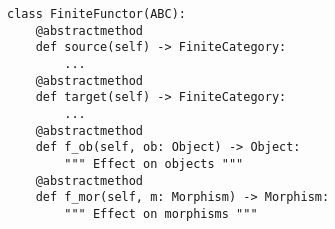 \par\begin{minipage}{60ex}
\begin{verbatim}
class FiniteFunctor(ABC):
    @abstractmethod
    def source(self) -> FiniteCategory:
        ...
    @abstractmethod
    def target(self) -> FiniteCategory:
        ...
    @abstractmethod
    def f_ob(self, ob: Object) -> Object:
        """ Effect on objects """
    @abstractmethod
    def f_mor(self, m: Morphism) -> Morphism:
        """ Effect on morphisms """
\end{verbatim}
\end{minipage}\par